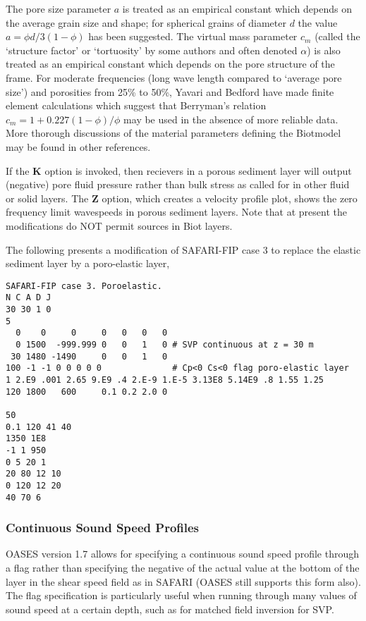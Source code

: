 The pore size parameter  $a$  is treated as an empirical constant
which depends on the average grain size and shape; for spherical
grains of diameter  $d$  the value  $a = {\phi d}/{3(1 - \phi)}$ has
been suggested\cite{hovem}.  The virtual mass parameter  $c_m$  (called
the `structure factor' or `tortuosity' by some authors and often
denoted  $\alpha$) is also treated as an empirical constant which
depends on the pore structure of the frame. For moderate frequencies
(long wave length compared to `average pore size') and porosities from
25\% to 50\%, Yavari and Bedford\cite{yavari} have made finite element
calculations which suggest that Berryman's relation  $c_m = 1 +
0.227(1 - \phi)/ \phi$ may be used in the absence of more reliable
data.  More thorough discussions of the material parameters defining
the Biotmodel may be found in other references\cite{biot}.

If the  {\bf K}  option is invoked, then recievers in a porous sediment
layer will output (negative) pore fluid pressure rather than bulk
stress as called for in other fluid or solid layers.  The {\bf Z}
option, which creates a velocity profile plot, shows the zero frequency
limit wavespeeds in porous sediment layers.  Note that at present the
modifications do NOT permit sources in Biot layers.

The following presents a modification of SAFARI-FIP case 3 to
replace the elastic sediment layer by a  poro-elastic layer,

\begin{verbatim}
SAFARI-FIP case 3. Poroelastic.
N C A D J
30 30 1 0
5
  0    0     0     0   0   0   0
  0 1500  -999.999 0   0   1   0 # SVP continuous at z = 30 m
 30 1480 -1490     0   0   1   0
100 -1 -1 0 0 0 0 0              # Cp<0 Cs<0 flag poro-elastic layer
1 2.E9 .001 2.65 9.E9 .4 2.E-9 1.E-5 3.13E8 5.14E9 .8 1.55 1.25
120 1800   600     0.1 0.2 2.0 0

50
0.1 120 41 40
1350 1E8
-1 1 950
0 5 20 1
20 80 12 10
0 120 12 20
40 70 6
\end{verbatim}



\subsubsection{Continuous Sound Speed Profiles}

OASES version 1.7 allows for specifying a continuous sound speed profile
through a flag rather than specifying the negative of the actual value
at the bottom of the layer in the shear speed field as in SAFARI
(OASES still supports this form also). The flag specification is
particularly useful when running through many values of sound speed at
a certain depth, such as for matched field inversion for SVP.

